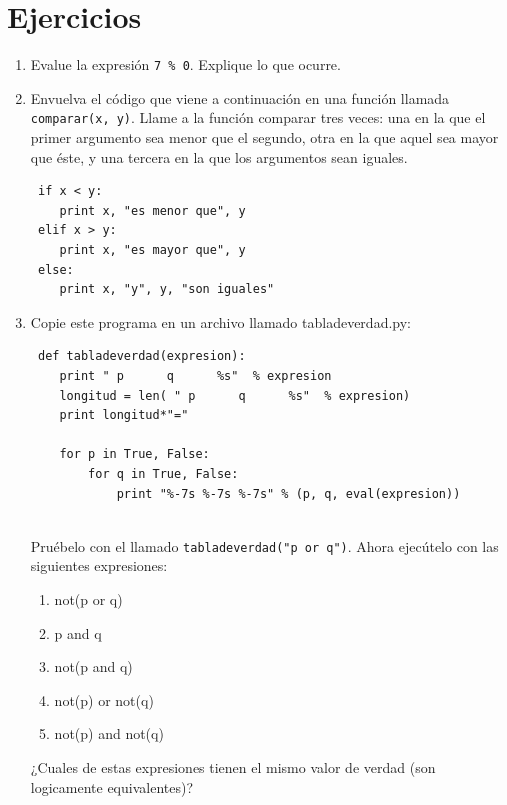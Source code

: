 \section{Ejercicios}
\begin{enumerate}

 \item Evalue la expresión \verb+7 % 0+. Explique lo que ocurre.
 
 \item Envuelva el código que viene a continuación en una función llamada \verb+comparar(x, y)+. Llame a la función comparar tres veces: 
 una en la que el primer argumento sea menor que el segundo, otra en la que aquel sea mayor que éste, y 
 una tercera en la que los argumentos sean iguales.
 \begin{verbatim} 
 if x < y:
    print x, "es menor que", y
 elif x > y:
    print x, "es mayor que", y
 else:
    print x, "y", y, "son iguales"
 \end{verbatim}
 
 \item Copie este programa en un archivo llamado tabladeverdad.py:
 \begin{verbatim}
 def tabladeverdad(expresion):
    print " p      q      %s"  % expresion
    longitud = len( " p      q      %s"  % expresion)
    print longitud*"="

    for p in True, False:
        for q in True, False:
            print "%-7s %-7s %-7s" % (p, q, eval(expresion))
 
 \end{verbatim}
 Pruébelo con el llamado \verb+tabladeverdad("p or q")+. Ahora ejecútelo con las siguientes expresiones:
 \begin{enumerate}
 \item not(p or q)
 \item p and q
 \item not(p and q)
 \item not(p) or not(q)
 \item not(p) and not(q)
 \end{enumerate}
 
 ¿Cuales de estas expresiones tienen el mismo valor de verdad (son logicamente equivalentes)?
 
 
 
\end{enumerate}

